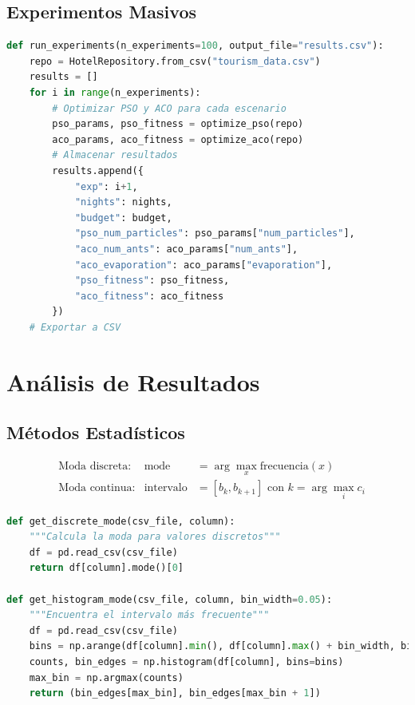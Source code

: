 \documentclass{article}
\begin{document}
\subsection{Experimentos Masivos}
\begin{lstlisting}[language=Python, caption=Ejecución de múltiples experimentos]
def run_experiments(n_experiments=100, output_file="results.csv"):
    repo = HotelRepository.from_csv("tourism_data.csv")
    results = []
    for i in range(n_experiments):
        # Optimizar PSO y ACO para cada escenario
        pso_params, pso_fitness = optimize_pso(repo)
        aco_params, aco_fitness = optimize_aco(repo)
        # Almacenar resultados
        results.append({
            "exp": i+1,
            "nights": nights,
            "budget": budget,
            "pso_num_particles": pso_params["num_particles"],
            "aco_num_ants": aco_params["num_ants"],
            "aco_evaporation": aco_params["evaporation"],
            "pso_fitness": pso_fitness,
            "aco_fitness": aco_fitness
        })
    # Exportar a CSV
\end{lstlisting}

\section{Análisis de Resultados}

\subsection{Métodos Estadísticos}
\begin{align*}
&\text{Moda discreta:} & \text{mode} &= \arg\max_{x} \text{frecuencia}(x) \\
&\text{Moda continua:} & \text{intervalo} &= [b_k, b_{k+1}] \text{ con } k = \arg\max_i c_i
\end{align*}

\begin{lstlisting}[language=Python, caption=Funciones de análisis estadístico]
def get_discrete_mode(csv_file, column):
    """Calcula la moda para valores discretos"""
    df = pd.read_csv(csv_file)
    return df[column].mode()[0]

def get_histogram_mode(csv_file, column, bin_width=0.05):
    """Encuentra el intervalo más frecuente"""
    df = pd.read_csv(csv_file)
    bins = np.arange(df[column].min(), df[column].max() + bin_width, bin_width)
    counts, bin_edges = np.histogram(df[column], bins=bins)
    max_bin = np.argmax(counts)
    return (bin_edges[max_bin], bin_edges[max_bin + 1])
\end{lstlisting}
\end{document}
